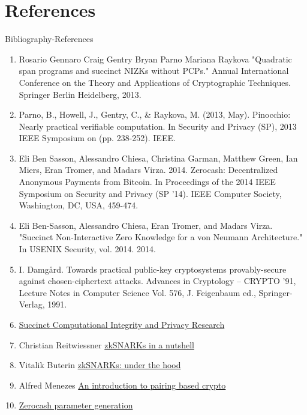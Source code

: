 \documentclass[handout]{beamer}
\begin{document}
\section{References}
\begin{frame}{Bibliography-References}
\begin{tiny}
\begin{enumerate}
\item Rosario Gennaro Craig Gentry Bryan Parno Mariana Raykova "Quadratic span programs and succinct NIZKs without PCPs." Annual International Conference on the Theory and Applications of Cryptographic Techniques. Springer Berlin Heidelberg, 2013.
\item Parno, B., Howell, J., Gentry, C., & Raykova, M. (2013, May). Pinocchio: Nearly practical verifiable computation. In Security and Privacy (SP), 2013 IEEE Symposium on (pp. 238-252). IEEE.
\item Eli Ben Sasson, Alessandro Chiesa, Christina Garman, Matthew Green, Ian Miers, Eran Tromer, and Madars Virza. 2014. Zerocash: Decentralized Anonymous Payments from Bitcoin. In Proceedings of the 2014 IEEE Symposium on Security and Privacy (SP '14). IEEE Computer Society, Washington, DC, USA, 459-474. 
\item Eli Ben-Sasson, Alessandro Chiesa, Eran Tromer, and Madars Virza. "Succinct Non-Interactive Zero Knowledge for a von Neumann Architecture." In USENIX Security, vol. 2014. 2014.
\item I. Damgård. Towards practical public-key cryptosystems provably-secure against chosen-ciphertext attacks. Advances in Cryptology – CRYPTO ’91, Lecture Notes
in Computer Science Vol. 576, J. Feigenbaum ed., Springer-Verlag, 1991.
\item \href{http://www.scipr-lab.org/}{Succinct Computational Integrity and Privacy Research}
\item Christian Reitwiessner \href{https://blog.ethereum.org/2016/12/05/zksnarks-in-a-nutshell/}{zkSNARKs in a nutshell}
\item Vitalik Buterin \href{https://medium.com/@VitalikButerin/zk-snarks-under-the-hood-b33151a013f6}{zkSNARKs: under the hood}
\item Alfred Menezes \href{https://www.math.uwaterloo.ca/~ajmeneze/publications/pairings.pdf}{An introduction to pairing based crypto}
\item \href{https://z.cash/technology/paramgen.html}{Zerocash parameter generation}
\end{enumerate}
\end{tiny}
\end{frame}
\end{document}
